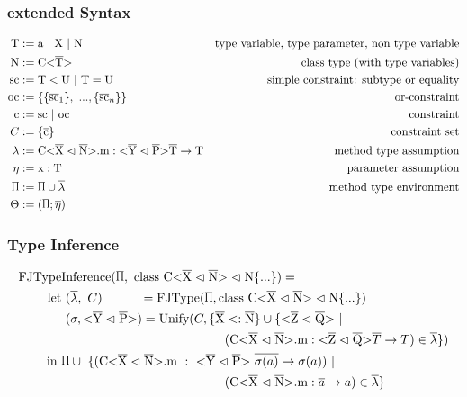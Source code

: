 \documentclass[aspectratio=169]{beamer}
\begin{document}
\begin{frame}[fragile]
    \frametitle{extended Syntax}
    \begin{align*}
        \text{T} &:= \text{a} \ | \ \text{X} \ | \ \text{N} &\text{type variable, type parameter, non type variable} \\
        \text{N} &:= \text{C} \vv{\ot{T}} &\text{class type (with type variables)}\\
        \text{sc} &:= \text{T} < \text{U} \ | \ \text{T} = \text{U} &\text{simple constraint: subtype or equality}\\
        \text{oc} &:= \{ \{ \ot{sc}_1 \}, \ ..., \{ \ot{sc}_n \} \} &\text{or-constraint}\\
        \text{c} &:= \text{sc} \ | \ \text{oc} &\text{constraint}\\
        C &:= \{ \ot{c} \} &\text{constraint set}\\
        \lambda &:= \cm : \yp \oto{\text{T}} &\text{method type assumption}\\
        \eta &:= \text{x} : \text{T} &\text{parameter assumption}\\
        \sprod{0.7} &:= \sprod{0.7} \cup \overline{\lambda} &\text{method type environment}\\
        \Theta &:= ( \sprod{0.7}; \overline{\eta} )
    \end{align*}
\end{frame}

\begin{frame}[fragile]
    \frametitle{Type Inference}
    \begin{align*}
        \text{FJType}&\text{Inference}(\sprod{0.7}, \ \classheader \{ ... \}) = \\
        \text{let} & \ (\overline{\lambda}, \ C) \quad \quad \quad = \text{FJType}(\sprod{0.7}, \classheader \{ ... \}) \\
        & \ (\sigma, \yp) = \text{Unify}(C, \{ \overline{\text{X}} <: \overline{\text{N}} \} \cup \{ \zq \ | \\
        & \quad \quad \quad \quad \quad \quad \quad \quad \quad \quad \quad \quad \quad (\cm : \zq \oto{T} ) \in \overline{\lambda} \} ) \\
        \text{in} \ & \sprod{0.7} \cup \ \{( \cm \ : \ \yp \ \oto{\sigma(a)}) \ | \\
        & \quad \quad \quad \quad \quad \quad \quad \quad \quad \quad \quad \quad \quad (\cm : \oto{a} ) \in \overline{\lambda} \}
    \end{align*}
\end{frame}
\end{document}
